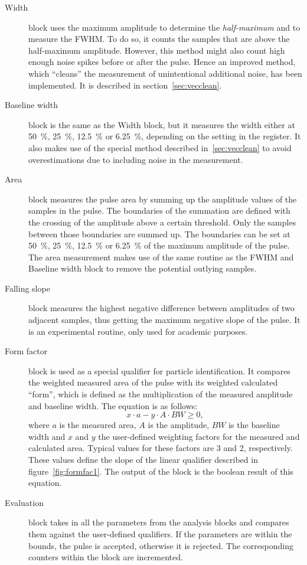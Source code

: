 \begin{description}
\item[Width] block uses the maximum amplitude to determine the \emph{half-maximum} and to measure the FWHM. To do so, it counts the samples that are above the half-maximum amplitude. However, this method might also count high enough noise spikes before or after the pulse. Hence an improved method, which ``cleans'' the measurement of unintentional additional noise, has been implemented. It is described in section~\ref{sec:vecclean}.
\item[Baseline width] block is the same as the Width block, but it measures the width either at 50~\%, 25~\%, 12.5~\% or 6.25~\%, depending on the setting in the register. It also makes use of the special method described in~\ref{sec:vecclean} to avoid overestimations due to including noise in the measurement.
\item[Area] block measures the pulse area by summing up the amplitude values of the samples in the pulse. The boundaries of the summation are defined with the crossing of the amplitude above a certain threshold. Only the samples between those boundaries are summed up. The boundaries can be set at  50~\%, 25~\%, 12.5~\% or 6.25~\% of the maximum amplitude of the pulse. The area measurement makes use of the same routine as the FWHM and Baseline width block to remove the potential outlying samples.

\item[Falling slope] block measures the highest negative difference between amplitudes of two adjacent samples, thus getting the maximum negative slope of the pulse. It is an experimental routine, only used for academic purposes.
\item[Form factor] block is used as a special qualifier for particle identification. It compares the weighted measured area of the pulse with its weighted calculated ``form'', which is defined as the multiplication of the measured amplitude and baseline width. The equation is as follows:
\begin{equation}
\label{eq:formfactor1}
x\cdot a - y \cdot A \cdot BW \geq 0,
\end{equation}
where $a$ is the measured area, $A$ is the amplitude, $BW$ is the baseline width and $x$ and $y$ the user-defined weighting factors for the measured and calculated area. Typical values for these factors are 3 and 2, respectively. These values define the slope of the linear qualifier described in figure~\ref{fig:formfac1}. The output of the block is the boolean result of this equation.
\item[Evaluation] block takes in all the parameters from the analysis blocks and compares them against the user-defined qualifiers. If the parameters are within the bounds, the pulse is accepted, otherwise it is rejected. The corresponding counters within the block are incremented.

\end{description}


